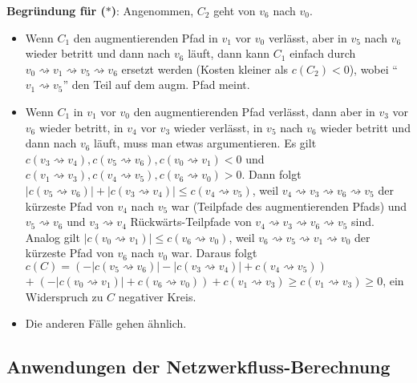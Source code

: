 \textbf{Begründung für ($\ast$)}:
Angenommen, $C_2$ geht von $v_6$ nach $v_0$.
\begin{itemize}
    \item
    Wenn $C_1$ den augmentierenden Pfad in $v_1$ vor $v_0$ verlässt, aber in $v_5$ nach $v_6$
    wieder betritt und dann nach $v_6$ läuft, dann kann $C_1$ einfach durch
    $v_0 \rightsquigarrow v_1 \rightsquigarrow v_5 \rightsquigarrow v_6$
    ersetzt werden (Kosten kleiner als $c(C_2) < 0$),
    wobei "`$v_1 \rightsquigarrow v_5$"' den Teil auf dem augm. Pfad meint.
    
    \item
    Wenn $C_1$ in $v_1$ vor $v_0$ den augmentierenden Pfad verlässt, dann aber in $v_3$ vor $v_6$
    wieder betritt, in $v_4$ vor $v_3$ wieder verlässt, in $v_5$ nach $v_6$ wieder betritt und
    dann nach $v_6$ läuft, muss man etwas argumentieren.
    Es gilt $c(v_3 \rightsquigarrow v_4), c(v_5 \rightsquigarrow v_6),
    c(v_0 \rightsquigarrow v_1) < 0$ und
    $c(v_1 \rightsquigarrow v_3), c(v_4 \rightsquigarrow v_5), c(v_6 \rightsquigarrow v_0) > 0$.
    Dann folgt $|c(v_5 \rightsquigarrow v_6)| + |c(v_3 \rightsquigarrow v_4)| \le
    c(v_4 \rightsquigarrow v_5)$, weil
    $v_4 \rightsquigarrow v_3 \rightsquigarrow v_6 \rightsquigarrow v_5$ der kürzeste Pfad von
    $v_4$ nach $v_5$ war (Teilpfade des augmentierenden Pfads)
    und $v_5 \rightsquigarrow v_6$ und $v_3 \rightsquigarrow v_4$ Rückwärts-Teilpfade von
    $v_4 \rightsquigarrow v_3 \rightsquigarrow v_6 \rightsquigarrow v_5$ sind.
    Analog gilt $|c(v_0 \rightsquigarrow v_1)| \le c(v_6 \rightsquigarrow v_0)$,
    weil $v_6 \rightsquigarrow v_5 \rightsquigarrow v_1 \rightsquigarrow v_0$ der kürzeste Pfad von
    $v_6$ nach $v_0$ war.
    Daraus folgt $c(C) =
    (-|c(v_5 \rightsquigarrow v_6)| - |c(v_3 \rightsquigarrow v_4)| +
    c(v_4 \rightsquigarrow v_5))$\\
    $+\; (-|c(v_0 \rightsquigarrow v_1)| + c(v_6 \rightsquigarrow v_0)) + c(v_1 \rightsquigarrow v_3)
    \ge c(v_1 \rightsquigarrow v_3) \ge 0$,
    ein Widerspruch zu $C$ negativer Kreis.
    
    \item
    Die anderen Fälle gehen ähnlich.
\end{itemize}

\subsection{%
    Anwendungen der Netzwerkfluss-Berechnung%
}

